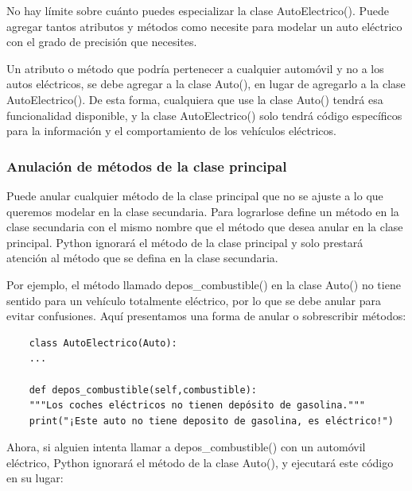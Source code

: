 {No hay límite sobre cuánto puedes especializar la clase {\ttfamily AutoElectrico()}.
Puede agregar tantos atributos y métodos como necesite para modelar un auto eléctrico
con el grado de precisión que necesites. 

Un atributo o método que podría pertenecer a cualquier automóvil y no a los autos eléctricos, se debe agregar a la clase {\ttfamily Auto()}, en lugar de agregarlo a la clase {\ttfamily AutoElectrico()}. De esta forma, cualquiera que use la clase {\ttfamily Auto()} tendrá esa funcionalidad disponible, y la clase {\ttfamily AutoElectrico()} solo tendrá código específicos  para la información y el comportamiento de los vehículos eléctricos.

\subsubsection{Anulación de métodos de la clase principal}

Puede anular cualquier método de la clase principal que no se ajuste a lo que queremos modelar en la clase secundaria. Para lograrlose  define un método en la clase secundaria con el mismo nombre que el método que desea anular en la clase principal. Python ignorará el método de la clase principal y solo prestará atención al método que se defina en la clase secundaria.

Por ejemplo, el método llamado {\ttfamily depos\_combustible()} en la clase {\ttfamily Auto()}  no tiene sentido para un vehículo totalmente eléctrico, por lo que se debe anular para evitar confusiones. Aquí presentamos una forma de anular o sobrescribir  métodos:

\hspace{-2.6cm}{\ttfamily \scriptsize Auto}

\vspace{-0.2cm}
\hspace{-2.6cm}{\ttfamily \scriptsize Electrico.py}\vspace{-1.00cm}
\begin{lstlisting}
	class AutoElectrico(Auto):
	...
	
	def depos_combustible(self,combustible):
	"""Los coches eléctricos no tienen depósito de gasolina."""
	print("¡Este auto no tiene deposito de gasolina, es eléctrico!")
\end{lstlisting}

Ahora, si alguien intenta llamar a {\ttfamily depos\_combustible()} con un automóvil eléctrico, Python ignorará el método de la clase {\ttfamily  Auto()}, y ejecutará este código en su lugar:

}
